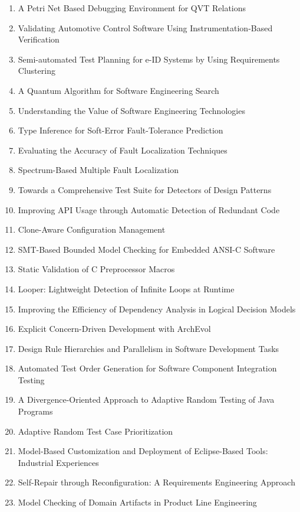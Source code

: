 \begin{enumerate}[itemsep=-1ex]
  \item A Petri Net Based Debugging Environment for QVT Relations
  \item Validating Automotive Control Software Using Instrumentation-Based Verification
  \item Semi-automated Test Planning for e-ID Systems by Using Requirements Clustering
  \item A Quantum Algorithm for Software Engineering Search
  \item Understanding the Value of Software Engineering Technologies
  \item Type Inference for Soft-Error Fault-Tolerance Prediction
  \item Evaluating the Accuracy of Fault Localization Techniques
  \item Spectrum-Based Multiple Fault Localization
  \item Towards a Comprehensive Test Suite for Detectors of Design Patterns
  \item Improving API Usage through Automatic Detection of Redundant Code
  \item Clone-Aware Configuration Management
  \item SMT-Based Bounded Model Checking for Embedded ANSI-C Software
  \item Static Validation of C Preprocessor Macros
  \item Looper: Lightweight Detection of Infinite Loops at Runtime
  \item Improving the Efficiency of Dependency Analysis in Logical Decision Models
  \item Explicit Concern-Driven Development with ArchEvol
  \item Design Rule Hierarchies and Parallelism in Software Development Tasks
  \item Automated Test Order Generation for Software Component Integration Testing
  \item A Divergence-Oriented Approach to Adaptive Random Testing of Java Programs
  \item Adaptive Random Test Case Prioritization
  \item Model-Based Customization and Deployment of Eclipse-Based Tools: Industrial Experiences
  \item Self-Repair through Reconfiguration: A Requirements Engineering Approach
  \item Model Checking of Domain Artifacts in Product Line Engineering

\end{enumerate}
